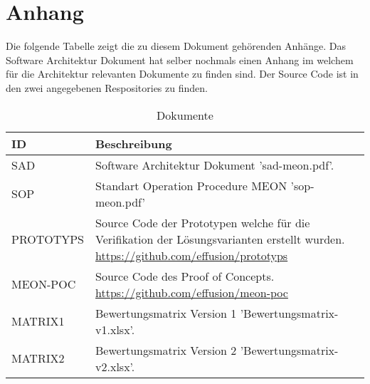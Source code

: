 \chapter{Anhang}
\label{documents}
Die folgende Tabelle zeigt die zu diesem Dokument gehörenden Anhänge. Das Software Architektur Dokument hat selber nochmals einen Anhang im welchem für die Architektur relevanten Dokumente zu finden sind. Der Source Code ist in den zwei angegebenen Respositories zu finden.

\begin{table}[H]
	\centering
	\caption{Dokumente}
	\begin{tabular}{ | p{3cm} | p{12cm} | }
		\toprule
		{\textbf{ID}} & {\textbf{Beschreibung}} \\
		\midrule
		SAD &  Software Architektur Dokument 'sad-meon.pdf'.\\ \hline
		SOP &  Standart Operation Procedure MEON 'sop-meon.pdf'\\ \hline
		PROTOTYPS & Source Code der Prototypen welche für die Verifikation der Lösungsvarianten erstellt wurden. \url{https://github.com/effusion/prototyps} \\ \hline
		MEON-POC &  Source Code des Proof of Concepts. \url{https://github.com/effusion/meon-poc}\\	\hline
		MATRIX1 & Bewertungsmatrix Version 1 'Bewertungsmatrix-v1.xlsx'.\\ \hline
		MATRIX2 & Bewertungsmatrix Version 2 'Bewertungsmatrix-v2.xlsx'.\\
		\bottomrule
	\end{tabular}
\end{table}